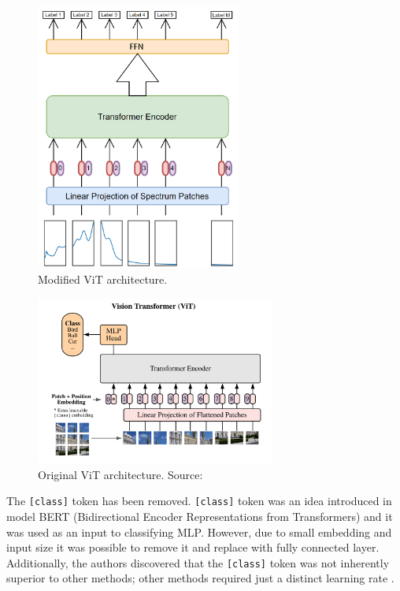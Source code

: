 \begin{figure}[ht] 
  \centering     
  \includegraphics[width=0.6\textwidth]{img/vit_changed.png} 
  \caption{Modified ViT architecture.}
  \label{fig:modified-vit-architecture}
\end{figure}

\begin{figure}[H] 
  \centering     
  \includegraphics[width=0.7\textwidth]{img/original_vit.png} 
  \caption{Original ViT architecture. Source: \cite{vitPaper}}
  \label{fig:original-vit-architecture}
\end{figure}


The \texttt{[class]} token has been removed.
\texttt{[class]} token was an idea introduced in model BERT (Bidirectional Encoder Representations from Transformers) \cite{bertOriginal} and it was used as an input to classifying MLP.
However, due to small embedding and input size it was possible to remove it and replace with fully connected layer.
Additionally, the authors discovered that the \texttt{[class]} token was not inherently superior to other methods; other methods required just a distinct learning rate \cite{vitPaper}.

